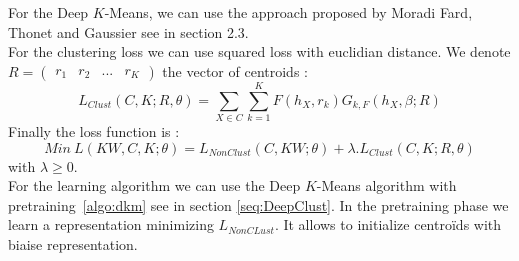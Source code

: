 For the Deep $K$-Means, we can use the approach proposed by Moradi Fard, Thonet and Gaussier 
\cite{Deap-K-Means} see in section 2.3.\\
For the clustering loss we can use squared loss with euclidian distance. We
denote $R = \begin{pmatrix} r_1 & r_2 & ... & r_K\end{pmatrix}$ the vector of
centroids :  
\begin{equation}\label{eq:loss_clust}
  L_{Clust}(C, K;R, \theta) = \sum_{X \in C}\sum_{k=1}^K F(h_X, r_k) G_{k, F}(h_X, \beta; R) 
\end{equation}
Finally the loss function is :
\begin{equation}\label{eq:loss_FINALE}
  Min~L(KW, C, K; \theta) = L_{NonClust}(C, KW; \theta) + \lambda.L_{Clust}(C, K;R, \theta)
\end{equation}
with $\lambda \geq 0$.\\
For the learning algorithm we can use the Deep $K$-Means algorithm with 
pretraining~\ref{algo:dkm} see in section \ref{seq:DeepClust}. In the 
pretraining phase we learn a representation minimizing $L_{NonCLust}$. It allows
to initialize centroïds with biaise representation.